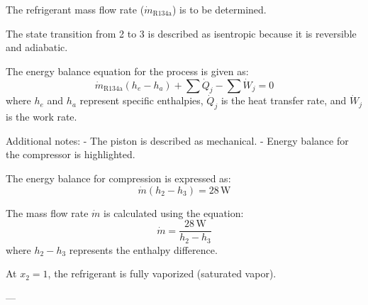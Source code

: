 The refrigerant mass flow rate (\(\dot{m}_{\text{R134a}}\)) is to be determined.  

The state transition from 2 to 3 is described as isentropic because it is reversible and adiabatic.  

The energy balance equation for the process is given as:  
\[
\dot{m}_{\text{R134a}} (h_e - h_a) + \sum \dot{Q}_j - \sum \dot{W}_j = 0
\]  
where \(h_e\) and \(h_a\) represent specific enthalpies, \(\dot{Q}_j\) is the heat transfer rate, and \(\dot{W}_j\) is the work rate.  

Additional notes:  
- The piston is described as mechanical.  
- Energy balance for the compressor is highlighted.  

The energy balance for compression is expressed as:  
\[
\dot{m} (h_2 - h_3) = 28 \, \text{W}
\]

The mass flow rate \( \dot{m} \) is calculated using the equation:  
\[
\dot{m} = \frac{28 \, \text{W}}{h_2 - h_3}
\]  
where \( h_2 - h_3 \) represents the enthalpy difference.  

At \( x_2 = 1 \), the refrigerant is fully vaporized (saturated vapor).  

---